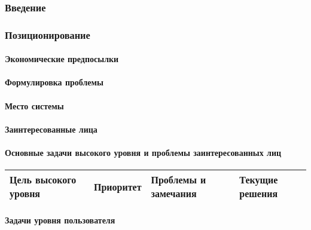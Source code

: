 \documentclass[a4paper, 14pt]{extarticle}
\begin{document}
\subsubsection*{Введение}


\subsubsection*{Позиционирование}

\paragraph*{Экономические предпосылки}


\paragraph*{Формулировка проблемы}


\paragraph*{Место системы}


\paragraph*{Заинтересованные лица}


\paragraph*{Основные задачи высокого уровня и проблемы заинтересованных лиц}


\begin{longtable}{|L{0.225\textwidth}|L{0.225\textwidth}|L{0.225\textwidth}|L{0.225\textwidth}|}
  \hline
  \textbf{Цель высокого уровня} & \textbf{Приоритет} & \textbf{Проблемы и замечания} & \textbf{Текущие решения} \\
  \hline
\end{longtable}

\paragraph*{Задачи уровня пользователя}
\end{document}
